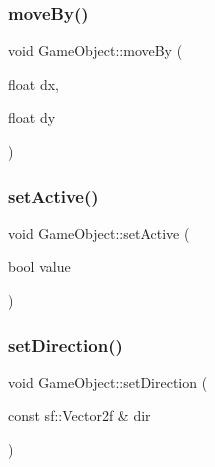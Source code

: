 \subsubsection{\texorpdfstring{move\+By()}{moveBy()}}
{\footnotesize\ttfamily void Game\+Object\+::move\+By (\begin{DoxyParamCaption}\item[{float}]{dx,  }\item[{float}]{dy }\end{DoxyParamCaption})}

\mbox{\label{class_game_object_a69049f93009eb35751e5088284d18247}} 
\subsubsection{\texorpdfstring{set\+Active()}{setActive()}}
{\footnotesize\ttfamily void Game\+Object\+::set\+Active (\begin{DoxyParamCaption}\item[{bool}]{value }\end{DoxyParamCaption})}

\mbox{\label{class_game_object_a82170ca0b119ea4096a939fd6f7c937e}} 
\subsubsection{\texorpdfstring{set\+Direction()}{setDirection()}}
{\footnotesize\ttfamily void Game\+Object\+::set\+Direction (\begin{DoxyParamCaption}\item[{const sf\+::\+Vector2f \&}]{dir }\end{DoxyParamCaption})}

